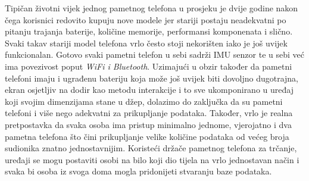 \documentclass[times, utf8, diplomski]{fer}
\begin{document}
Tipičan životni vijek jednog pametnog telefona u prosjeku je dvije godine nakon čega korisnici redovito kupuju nove modele jer stariji postaju neadekvatni
po pitanju trajanja baterije, količine memorije, performansi komponenata i slično. Svaki takav stariji model telefona vrlo često stoji nekorišten iako je još uvijek
funkcionalan. Gotovo svaki pametni telefon u sebi sadrži IMU senzor te u sebi već ima povezivost poput \textit{WiFi i Bluetooth}. Uzimajući u obzir
također da pametni telefoni imaju i ugrađenu bateriju koja može još uvijek biti dovoljno dugotrajna, ekran osjetljiv na dodir kao metodu interakcije i to 
sve ukomponirano u uređaj koji svojim dimenzijama stane u džep, dolazimo do zaključka da su pametni telefoni i više nego adekvatni za prikupljanje podataka.
Također, vrlo je realna pretpostavka da svaka osoba ima pristup minimalno jednome, vjerojatno i dva pametna telefona što čini prikupljanje velike količine
podataka od većeg broja sudionika znatno jednostavnijim. Koristeći držače pametnog telefona za trčanje, uređaji se mogu postaviti osobi na bilo koji
dio tijela na vrlo jednostavan način i svaka bi osoba iz svoga doma mogla pridonijeti stvaranju baze podataka.
\end{document}
